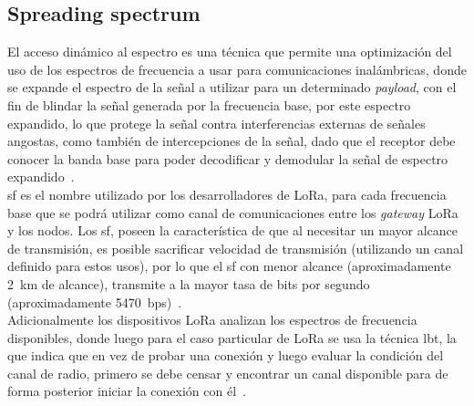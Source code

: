 \begin{justify}
\section{Spreading spectrum}
El acceso dinámico al espectro es una técnica que permite una optimización del uso de los espectros de frecuencia a usar para comunicaciones inalámbricas, donde se expande el espectro de la señal a utilizar para un determinado \textit{payload}, con el fin de blindar la señal generada por la frecuencia base, por este espectro expandido, lo que protege la señal contra interferencias externas de señales angostas, como también de intercepciones de la señal, dado que el receptor debe conocer la banda base para poder decodificar y demodular la señal de espectro expandido~\cite{modulation}.\\
\gls{sf} es el nombre utilizado por los desarrolladores de LoRa, para cada frecuencia base que se podrá utilizar como canal de comunicaciones entre los \textit{gateway} LoRa y los nodos. Los \gls{sf}, poseen la característica de que al necesitar un mayor alcance de transmisión, es posible sacrificar velocidad de transmisión (utilizando un canal definido para estos usos), por lo que el \gls{sf} con menor alcance (aproximadamente \SI{2}{\kilo\meter} de alcance), transmite a la mayor tasa de bits por segundo (aproximadamente \SI{5470}{bps})~\cite{orange}.\\
Adicionalmente los dispositivos LoRa analizan los espectros de frecuencia disponibles, donde luego para el caso particular de LoRa se usa la técnica \gls{lbt}, la que indica que en vez de probar una conexión y luego evaluar la condición del canal de radio, primero se debe censar y encontrar un canal disponible para de forma posterior iniciar la conexión con él~\cite{modulation}.

\end{justify}
